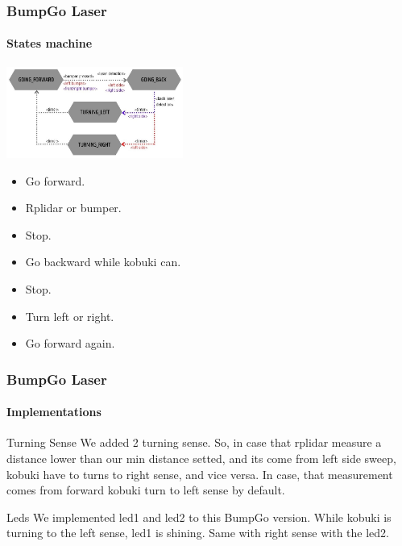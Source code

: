 \documentclass{beamer}
\begin{document}

\begin{frame}
\frametitle{BumpGo Laser}
\framesubtitle{States machine}

\centering
\includegraphics[height=3cm]{Bumpgolaser.jpg}

\begin{itemize}

	\item Go forward. \\ \item Rplidar or bumper.\\ \item Stop.
	\item Go backward while kobuki can. \\ \item Stop.\\ \item Turn left or right.\\ \item Go forward again.

\end{itemize}



\end{frame}

\begin{frame}
\frametitle{BumpGo Laser}
\framesubtitle{Implementations}
\begin{block}{Turning Sense}
	We added 2 turning sense. So, in case that rplidar measure a distance lower than our min distance setted, and its come from left side sweep, kobuki have to turns to
	right sense, and vice versa. In case, that measurement comes from forward kobuki turn to left sense by default.
\end{block}

\begin{block}{Leds}
	We implemented led1 and led2 to this BumpGo version. While kobuki is turning to the left sense, led1 is shining. Same with right sense with the led2.
\end{block}


\end{frame}
\end{document}
